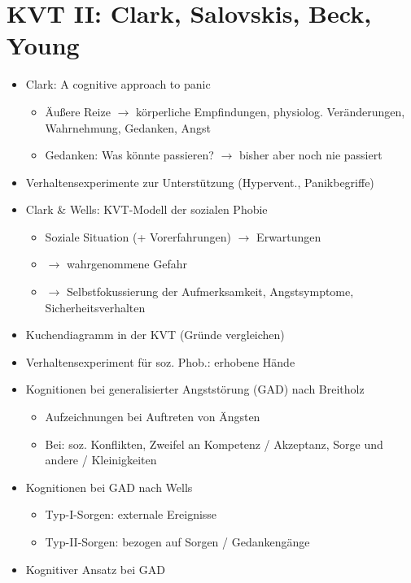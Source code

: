 \documentclass[11pt, paper=a4, twocolumn]{scrartcl}
\begin{document}
	\section{KVT II: Clark, Salovskis, Beck, Young}
		\begin{itemize}
			\item Clark: A cognitive approach to panic
				\begin{itemize}
					\item Äußere Reize $\rightarrow$ körperliche Empfindungen, physiolog. Veränderungen, Wahrnehmung, Gedanken, 
						Angst
					\item Gedanken: Was könnte passieren? $\rightarrow$ bisher aber noch nie passiert
				\end{itemize}
			\item Verhaltensexperimente zur Unterstützung (Hypervent., Panikbegriffe)
			\item Clark \& Wells: KVT-Modell der sozialen Phobie
				\begin{itemize}
					\item Soziale Situation (+ Vorerfahrungen) $\rightarrow$ Erwartungen
					\item $\rightarrow$ wahrgenommene Gefahr
					\item $\rightarrow$ Selbstfokussierung der Aufmerksamkeit, Angstsymptome, Sicherheitsverhalten
				\end{itemize}
			\item Kuchendiagramm in der KVT (Gründe vergleichen)
			\item Verhaltensexperiment für soz. Phob.: erhobene Hände
			\item Kognitionen bei generalisierter Angststörung (GAD) nach Breitholz
				\begin{itemize}
					\item Aufzeichnungen bei Auftreten von Ängsten
					\item Bei: soz. Konflikten, Zweifel an Kompetenz / Akzeptanz, Sorge und andere / Kleinigkeiten
				\end{itemize}
			\item Kognitionen bei GAD nach Wells
				\begin{itemize}
					\item Typ-I-Sorgen: externale Ereignisse 
					\item Typ-II-Sorgen: bezogen auf Sorgen / Gedankengänge
				\end{itemize}
			\item Kognitiver Ansatz bei GAD
				\begin{itemize}

\end{itemize}
\end{itemize}
\end{document}
